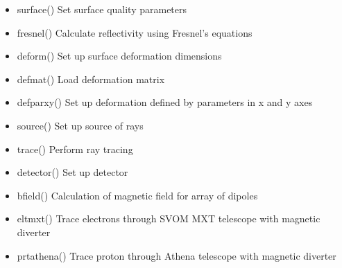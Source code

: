 \documentclass[letterpaper,10pt,english]{sphinxmanual}
\begin{document}
\begin{itemize}
\item {} 
surface() Set surface quality parameters

\item {} 
fresnel() Calculate reflectivity using Fresnel’s equations

\item {} 
deform() Set up surface deformation dimensions

\item {} 
defmat() Load deformation matrix

\item {} 
defparxy() Set up deformation defined by parameters in x and y axes

\end{itemize}

\begin{itemize}
\item {} 
source() Set up source of rays

\item {} 
trace() Perform ray tracing

\item {} 
detector() Set up detector

\end{itemize}

\begin{itemize}
\item {} 
bfield() Calculation of magnetic field for array of dipoles

\item {} 
eltmxt() Trace electrons through SVOM MXT telescope with magnetic diverter

\item {} 
prtathena() Trace proton through Athena telescope with magnetic diverter

\end{itemize}
\label{\detokenize{xsrt_functions:module-xsrt}}
\end{document}
